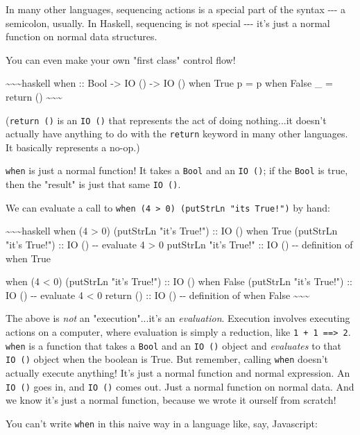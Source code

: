 \documentclass[]{article}
\begin{document}
In many other languages, sequencing actions is a special part of the syntax
-\/-\/- a semicolon, usually. In Haskell, sequencing is not special -\/-\/- it's
just a normal function on normal data structures.

You can even make your own "first class" control flow!

\textasciitilde{}\textasciitilde{}\textasciitilde{}haskell when :: Bool
-\textgreater{} IO () -\textgreater{} IO () when True p = p when False \_ =
return () \textasciitilde{}\textasciitilde{}\textasciitilde{}

(\texttt{return\ ()} is an \texttt{IO\ ()} that represents the act of doing
nothing...it doesn't actually have anything to do with the \texttt{return}
keyword in many other languages. It basically represents a no-op.)

\texttt{when} is just a normal function! It takes a \texttt{Bool} and an
\texttt{IO\ ()}; if the \texttt{Bool} is true, then the "result" is just that
same \texttt{IO\ ()}.

We can evaluate a call to
\texttt{when\ (4\ \textgreater{}\ 0)\ (putStrLn\ "it\textquotesingle{}s\ True!")}
by hand:

\textasciitilde{}\textasciitilde{}\textasciitilde{}haskell when (4
\textgreater{} 0) (putStrLn "it's True!") :: IO () when True (putStrLn "it's
True!") :: IO () -\/- evaluate 4 \textgreater{} 0 putStrLn "it's True!" :: IO ()
-\/- definition of when True

when (4 \textless{} 0) (putStrLn "it's True!") :: IO () when False (putStrLn
"it's True!") :: IO () -\/- evaluate 4 \textless{} 0 return () :: IO () -\/-
definition of when False \textasciitilde{}\textasciitilde{}\textasciitilde{}

The above is \emph{not} an "execution"...it's an \emph{evaluation}. Execution
involves executing actions on a computer, where evaluation is simply a
reduction, like \texttt{1\ +\ 1\ ==\textgreater{}\ 2}. \texttt{when} is a
function that takes a \texttt{Bool} and an \texttt{IO\ ()} object and
\emph{evaluates} to that \texttt{IO\ ()} object when the boolean is True. But
remember, calling \texttt{when} doesn't actually execute anything! It's just a
normal function and normal expression. An \texttt{IO\ ()} goes in, and
\texttt{IO\ ()} comes out. Just a normal function on normal data. And we know
it's just a normal function, because we wrote it ourself from scratch!

You can't write \texttt{when} in this naive way in a language like, say,
Javascript:
\end{document}

